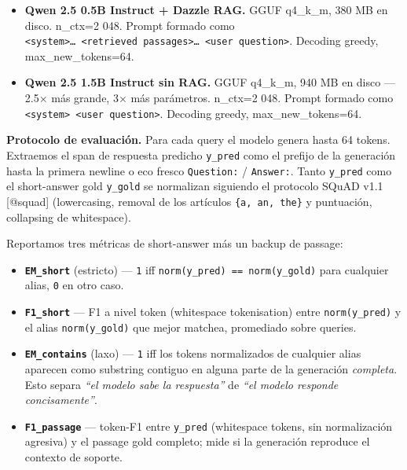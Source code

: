 \begin{itemize}
\tightlist
\item
  \textbf{Qwen 2.5 0.5B Instruct + Dazzle RAG.} GGUF q4\_k\_m, 380 MB en disco.
  n\_ctx=2 048. Prompt formado como
  \texttt{\textless{}system\textgreater{}…\ \textless{}retrieved\ passages\textgreater{}…\ \textless{}user\ question\textgreater{}}.
  Decoding greedy, max\_new\_tokens=64.
\item
  \textbf{Qwen 2.5 1.5B Instruct sin RAG.} GGUF q4\_k\_m, 940 MB en disco ---
  2.5× más grande, 3× más parámetros. n\_ctx=2 048. Prompt formado como
  \texttt{\textless{}system\textgreater{}\ \textless{}user\ question\textgreater{}}.
  Decoding greedy, max\_new\_tokens=64.
\end{itemize}

\textbf{Protocolo de evaluación.} Para cada query el modelo genera hasta 64
tokens. Extraemos el span de respuesta predicho \texttt{y\_pred} como el prefijo
de la generación hasta la primera newline o eco fresco \texttt{Question:} /
\texttt{Answer:}. Tanto \texttt{y\_pred} como el short-answer gold
\texttt{y\_gold} se normalizan siguiendo el protocolo SQuAD v1.1 {[}@squad{]}
(lowercasing, removal de los artículos \texttt{\{a,\ an,\ the\}} y puntuación,
collapsing de whitespace).

Reportamos tres métricas de short-answer más un backup de passage:

\begin{itemize}
\tightlist
\item
  \textbf{\texttt{EM\_short}} (estricto) --- \texttt{1} iff
  \texttt{norm(y\_pred)\ ==\ norm(y\_gold)} para cualquier alias, \texttt{0} en
  otro caso.
\item
  \textbf{\texttt{F1\_short}} --- F1 a nivel token (whitespace tokenisation)
  entre \texttt{norm(y\_pred)} y el alias \texttt{norm(y\_gold)} que mejor
  matchea, promediado sobre queries.
\item
  \textbf{\texttt{EM\_contains}} (laxo) --- \texttt{1} iff los tokens
  normalizados de cualquier alias aparecen como substring contiguo en alguna
  parte de la generación \emph{completa}. Esto separa \emph{``el modelo sabe la
  respuesta''} de \emph{``el modelo responde concisamente''}.
\item
  \textbf{\texttt{F1\_passage}} --- token-F1 entre \texttt{y\_pred} (whitespace
  tokens, sin normalización agresiva) y el passage gold completo; mide si la
  generación reproduce el contexto de soporte.
\end{itemize}


